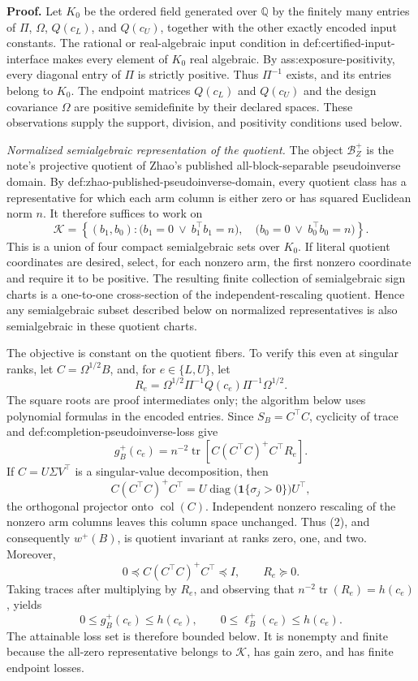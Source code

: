 \textbf{Proof.}
Let \(K_0\) be the ordered field generated over \(\mathbb Q\) by the finitely many entries of \(\Pi\), \(\Omega\), \(Q(c_L)\), and \(Q(c_U)\), together with the other exactly encoded input constants.  The rational or real-algebraic input condition in def:certified-input-interface makes every element of \(K_0\) real algebraic.  By ass:exposure-positivity, every diagonal entry of \(\Pi\) is strictly positive.  Thus \(\Pi^{-1}\) exists, and its entries belong to \(K_0\).  The endpoint matrices \(Q(c_L)\) and \(Q(c_U)\) and the design covariance \(\Omega\) are positive semidefinite by their declared spaces.  These observations supply the support, division, and positivity conditions used below.

\emph{Normalized semialgebraic representation of the quotient.}
The object \(\mathcal B_Z^+\) is the note's projective quotient of Zhao's published all-block-separable pseudoinverse domain.  By def:zhao-published-pseudoinverse-domain, every quotient class has a representative for which each arm column is either zero or has squared Euclidean norm \(n\).  It therefore suffices to work on
\[
 \mathcal K
 =\left\{(b_1,b_0):
   \bigl(b_1=0\ \vee\ b_1^{\top}b_1=n\bigr),\quad
   \bigl(b_0=0\ \vee\ b_0^{\top}b_0=n\bigr)
  \right\}.
\tag{1}
\]
This is a union of four compact semialgebraic sets over \(K_0\).  If literal quotient coordinates are desired, select, for each nonzero arm, the first nonzero coordinate and require it to be positive.  The resulting finite collection of semialgebraic sign charts is a one-to-one cross-section of the independent-rescaling quotient.  Hence any semialgebraic subset described below on normalized representatives is also semialgebraic in these quotient charts.

The objective is constant on the quotient fibers.  To verify this even at singular ranks, let \(C=\Omega^{1/2}B\), and, for \(e\in\{L,U\}\), let
\[
 R_e=\Omega^{1/2}\Pi^{-1}Q(c_e)\Pi^{-1}\Omega^{1/2}.
\]
The square roots are proof intermediates only; the algorithm below uses polynomial formulas in the encoded entries.  Since \(S_B=C^{\top}C\), cyclicity of trace and def:completion-pseudoinverse-loss give
\[
 g_B^+(c_e)
 =n^{-2}\operatorname{tr}\!\left[
 C(C^{\top}C)^+C^{\top}R_e
 \right].
\tag{2}
\]
If \(C=U\Sigma V^{\top}\) is a singular-value decomposition, then
\[
 C(C^{\top}C)^+C^{\top}
 =U\operatorname{diag}\!\bigl(\mathbf 1\{\sigma_j>0\}\bigr)U^{\top},
\]
the orthogonal projector onto \(\operatorname{col}(C)\).  Independent nonzero rescaling of the nonzero arm columns leaves this column space unchanged.  Thus (2), and consequently \(w^+(B)\), is quotient invariant at ranks zero, one, and two.  Moreover,
\[
 0\preceq C(C^{\top}C)^+C^{\top}\preceq I,
 \qquad R_e\succeq0.
\]
Taking traces after multiplying by \(R_e\), and observing that \(n^{-2}\operatorname{tr}(R_e)=h(c_e)\), yields
\[
 0\le g_B^+(c_e)\le h(c_e),
 \qquad
 0\le \ell_B^+(c_e)\le h(c_e).
\tag{3}
\]
The attainable loss set is therefore bounded below.  It is nonempty and finite because the all-zero representative belongs to \(\mathcal K\), has gain zero, and has finite endpoint losses.

